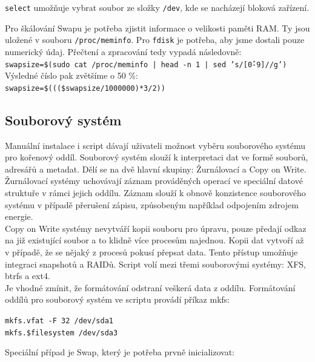 \documentclass[12pt,a4paper,twoside,]{article}
\begin{document}
\texttt{\hspace*{-1.5em}select} umožňuje vybrat soubor ze složky \texttt{/dev}, kde se nacházejí bloková zařízení.
\newpage
{\hspace*{-1.5em}Pro škálování Swapu je potřeba zjistit informace o velikosti paměti RAM. Ty jsou uložené v souboru \texttt{/proc/meminfo}. Pro \texttt{fdisk} je potřeba, aby jsme dostali pouze numerický údaj. Přečtení a zpracování tedy vypadá následovně:\\
	
\texttt{swapsize=\$(sudo cat /proc/meminfo | head -n 1 | sed 's/[\^0-9]//g')}\\

\hspace*{-1.5em}Výsledné číslo pak zvětšíme o 50 \%:\\ 

\texttt{swapsize=\$(((\$swapsize/1000000)*3/2))}\\




\newpage
\subsection{\textsf{Souborový systém}}
Manuální instalace i script dávají uživateli možnost vyběru souborového systému pro kořenový oddíl.
Souborový systém slouží k interpretaci dat ve formě souborů, adresářů a metadat. Dělí se na dvě hlavní skupiny: Žurnálovací a Copy on Write.\\
Žurnálovací systémy uchovávají záznam prováděných operací ve speciální datové struktuře v rámci jejich oddílu. 
Záznam slouží k obnově konzistence souborového systému v případě přerušení zápisu, způsobeným například odpojením zdrojem energie. \\
Copy on Write systémy nevytváří kopii souboru pro úpravu, pouze předají odkaz na již existující soubor a to klidně více procesům najednou.
Kopii dat vytvoří až v případě, že se nějaký z procesů pokusí přepsat data. Tento přístup umožňuje integraci snapshotů a RAIDů.
Script volí mezi třemi souborovými systémy: XFS, btrfs a ext4. \\Je vhodné zmínit, že formátování odstraní veškerá data z oddílu. 
Formátování oddílů pro souborový systém ve scriptu provádí příkaz mkfs: 

\texttt{mkfs.vfat -F 32 /dev/sda1}\\
\texttt{\hspace*{1.5em}mkfs.\$filesystem /dev/sda3}

\hspace*{-1.5em}Speciální případ je Swap, který je potřeba prvně inicializovat: 

}
\end{document}
